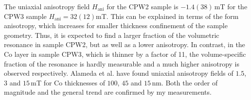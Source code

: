 The uniaxial anisotropy field $H_\text{ani}$ for the CPW2 sample is $-1.4(38)\,$mT for the CPW3 sample $H_\text{ani}=32(12)$mT. This can be explained in terms of the form anisotropy, which increases for smaller thickness confinement of the sample geometry. Thus, it is expected to find a larger fraction of the volumetric resonance in sample CPW2, but as well as a lower anisotropy. In contrast, in the Co layer in sample CPW3, which is thinner by a factor of 11, the volume-specific fraction of the resonance is hardly measurable and a much higher anisotropy is observed respectively. Alameda et al. have found uniaxial anisotropy fields of $1.5$, $3$ and $15\,$mT for Co thicknesses of $100$, $45$ and $15\,$nm. Both the order of magnitude and the general trend are confirmed by my measurements. \cite{ALAMEDA1996}